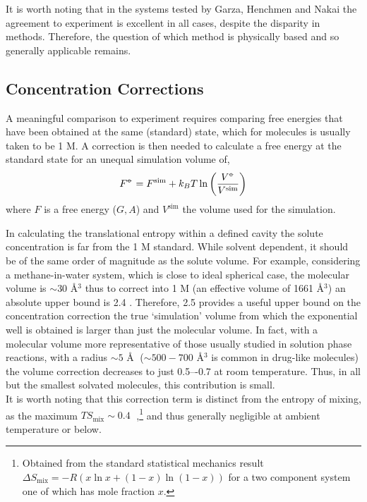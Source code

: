 \documentclass[../main.tex]{subfiles}
\begin{document}
It is worth noting that in the systems tested by Garza, Henchmen and Nakai the agreement to experiment is excellent in all cases, despite the disparity in methods. Therefore, the question of which method is physically based and so generally applicable remains.

\subsection{Concentration Corrections}

A meaningful comparison to experiment requires comparing free energies that have been obtained at the same (standard) state, which for molecules is usually taken to be 1 M. A correction is then needed to calculate a free energy at the standard state for an unequal simulation volume of,\cite{General2010} 
\begin{equation}
	F^{{\circ\kern-0.495em-}} = F^\text{sim} + k_BT \ln\left(\frac{V^{\circ\kern-0.495em-}}{V^\text{sim}}\right)
\end{equation}
where $F$ is a free energy ($G, A$) and $V^\text{sim}$ the volume used for the simulation. 

In calculating the translational entropy within a defined cavity the solute concentration is far from the 1 M standard. While solvent dependent, it should be of the same order of magnitude as the solute volume. For example, considering a methane-in-water system, which is close to ideal spherical case, the molecular volume is $\sim 30$ \AA$^3$\cite{Zhao2003} thus to correct into 1 M (an effective volume of 1661 \AA$^3$) an absolute upper bound is 2.4 \kcal. 
Therefore, 2.5 \kcalx provides a useful upper bound on the concentration correction the true `simulation' volume from which the exponential well is obtained is larger than just the molecular volume. In fact, with a molecular volume more representative of those usually studied in solution phase reactions, with a radius $\sim 5$ \AA$\;$  ($\sim 500-700$ \AA$^3$ is common in drug-like molecules\cite{Khanna2009}) the volume correction decreases to just 0.5–-0.7 \kcalx at room temperature. Thus, in all but the smallest solvated molecules, this contribution is small.
\\
It is worth noting that this correction term is distinct from the entropy of mixing, as the maximum $TS_\text{mix} \sim 0.4\;$ \kcal,\footnote{Obtained from the standard statistical mechanics result $\Delta S_\text{mix} = -R(x \ln x + (1-x)\ln(1 - x))$ for a two component system one of which has mole fraction $x$.}  and thus generally negligible at ambient temperature or below.
\end{document}

